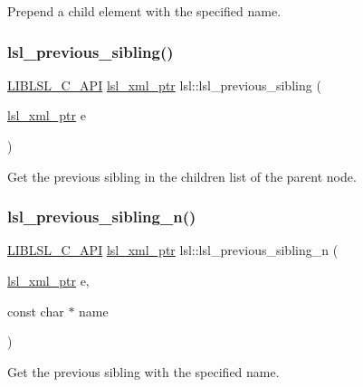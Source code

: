 Prepend a child element with the specified name. \mbox{\label{namespacelsl_a61acf3af105e47f718bbc312766caf44}} 
\subsubsection{\texorpdfstring{lsl\+\_\+previous\+\_\+sibling()}{lsl\_previous\_sibling()}}
{\footnotesize\ttfamily \hyperlink{lsl__cpp_8h_aafd0ef1813e8be84a1420c4f1df64615}{L\+I\+B\+L\+S\+L\+\_\+\+C\+\_\+\+A\+PI} \hyperlink{namespacelsl_a5edc7a49a1a1be1634fe6dce3d59c59b}{lsl\+\_\+xml\+\_\+ptr} lsl\+::lsl\+\_\+previous\+\_\+sibling (\begin{DoxyParamCaption}\item[{\hyperlink{namespacelsl_a5edc7a49a1a1be1634fe6dce3d59c59b}{lsl\+\_\+xml\+\_\+ptr}}]{e }\end{DoxyParamCaption})}

Get the previous sibling in the children list of the parent node. \mbox{\label{namespacelsl_a1b42f95654ea48c92a15bd077e6c73ac}} 
\subsubsection{\texorpdfstring{lsl\+\_\+previous\+\_\+sibling\+\_\+n()}{lsl\_previous\_sibling\_n()}}
{\footnotesize\ttfamily \hyperlink{lsl__cpp_8h_aafd0ef1813e8be84a1420c4f1df64615}{L\+I\+B\+L\+S\+L\+\_\+\+C\+\_\+\+A\+PI} \hyperlink{namespacelsl_a5edc7a49a1a1be1634fe6dce3d59c59b}{lsl\+\_\+xml\+\_\+ptr} lsl\+::lsl\+\_\+previous\+\_\+sibling\+\_\+n (\begin{DoxyParamCaption}\item[{\hyperlink{namespacelsl_a5edc7a49a1a1be1634fe6dce3d59c59b}{lsl\+\_\+xml\+\_\+ptr}}]{e,  }\item[{const char $\ast$}]{name }\end{DoxyParamCaption})}

Get the previous sibling with the specified name. \mbox{\label{namespacelsl_a9695264d0e763474d352767702b38222}} 

